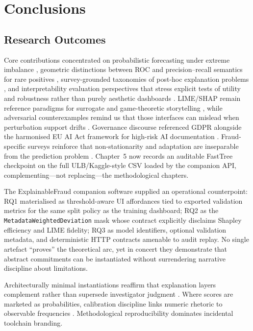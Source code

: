 \chapter{Conclusions}

\section{Research Outcomes}
Core contributions concentrated on probabilistic forecasting under extreme imbalance \cite{he_garcia_imbalanced2009,fraud_handbook}, geometric distinctions between ROC and precision--recall semantics for rare positives \cite{davis_goadrich_icml06}, survey-grounded taxonomies of post-hoc explanation problems \cite{guidotti_blackbox_survey2018,xai_survey}, and interpretability evaluation perspectives that stress explicit tests of utility and robustness rather than purely aesthetic dashboards \cite{doshi_velez_kim_interpretability_2017}. LIME/SHAP remain reference paradigms for surrogate and game-theoretic storytelling \cite{lime_original,shap_original}, while adversarial counterexamples remind us that those interfaces can mislead when perturbation support drifts \cite{slack2020_fooling_lime_shap}. Governance discourse referenced GDPR alongside the harmonised EU AI Act framework for high-risk AI documentation \cite{gdpr_text,eu_ai_act2024}. Fraud-specific surveys reinforce that non-stationarity and adaptation are inseparable from the prediction problem \cite{lucas_jurgovsky_ccfraud_survey2020,yousefi_fraud_survey2019}. Chapter~5 now records an auditable FastTree checkpoint on the full ULB/Kaggle-style CSV loaded by the companion API, complementing---not replacing---the methodological chapters.

The ExplainableFraud companion software supplied an operational counterpoint: RQ1 materialised as threshold-aware UI affordances tied to exported validation metrics for the same split policy as the training dashboard; RQ2 as the \texttt{MetadataWeightedDeviation} mask whose contract explicitly disclaims Shapley efficiency and LIME fidelity; RQ3 as model identifiers, optional validation metadata, and deterministic HTTP contracts amenable to audit replay. No single artefact ``proves'' the theoretical arc, yet in concert they demonstrate that abstract commitments can be instantiated without surrendering narrative discipline about limitations.

Architecturally minimal instantiations reaffirm that explanation layers complement rather than supersede investigator judgment \cite{rudin_stopexplaining2019,fraud_handbook}. Where scores are marketed as probabilities, calibration discipline links numeric rhetoric to observable frequencies \cite{niculescu_caruana_calib2005}. Methodological reproducibility dominates incidental toolchain branding.

